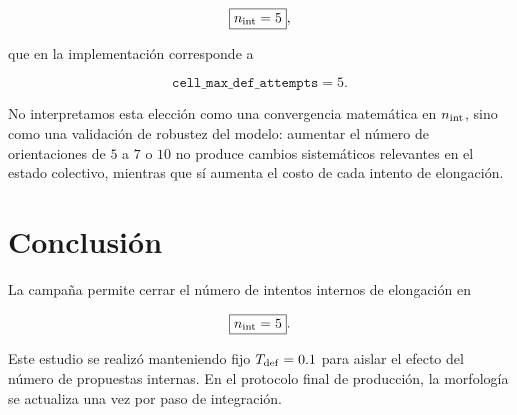 \documentclass[11pt,a4paper]{article}
\begin{document}
\begin{equation}
\boxed{n_{\rm int}=5},
\end{equation}

que en la implementación corresponde a

\begin{equation}
\boxed{\texttt{cell\_max\_def\_attempts}=5}.
\end{equation}

No interpretamos esta elección como una convergencia matemática en
\(n_{\rm int}\), sino como una validación de robustez del modelo: aumentar el
número de orientaciones de \(5\) a \(7\) o \(10\) no produce cambios
sistemáticos relevantes en el estado colectivo, mientras que sí aumenta el
costo de cada intento de elongación.

\section{Conclusión}

La campaña permite cerrar el número de intentos internos de elongación en

\begin{equation}
\boxed{n_{\rm int}=5}.
\end{equation}

Este estudio se realizó manteniendo fijo \(T_{\rm def}=0.1\) para aislar el
efecto del número de propuestas internas. En el protocolo final de producción,
la morfología se actualiza una vez por paso de integración.
\end{document}
